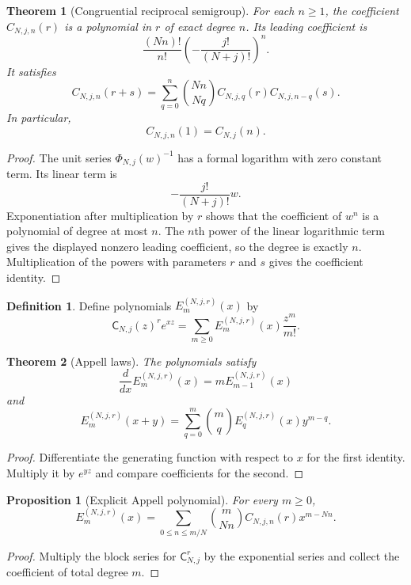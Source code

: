 \documentclass{aomart}
\newtheorem{theorem}{Theorem}[section]
\newtheorem{proposition}[proposition]{Proposition}
\theoremstyle{definition}
\newtheorem{definition}[definition]{Definition}
\theoremstyle{remark}
\newcommand{\Cfun}{\mathsf C}
\begin{document}
\begin{theorem}[Congruential reciprocal semigroup]\label{thm:congruential_semigroup}
For each $n\geq1$, the coefficient $C_{N,j,n}(r)$ is a polynomial in $r$ of exact degree $n$.  Its leading coefficient is
\[
\frac{(Nn)!}{n!}
\left(-\frac{j!}{(N+j)!}\right)^n.
\]
It satisfies
\[
C_{N,j,n}(r+s)
=
\sum_{q=0}^{n}
\binom{Nn}{Nq}
C_{N,j,q}(r)C_{N,j,n-q}(s).
\]
In particular,
\[
C_{N,j,n}(1)=C_{N,j}(n).
\]
\end{theorem}

\begin{proof}
The unit series $\Phi_{N,j}(w)^{-1}$ has a formal logarithm with zero constant term.  Its linear term is
\[
-\frac{j!}{(N+j)!}w.
\]
Exponentiation after multiplication by $r$ shows that the coefficient of $w^n$ is a polynomial of degree at most $n$.  The $n$th power of the linear logarithmic term gives the displayed nonzero leading coefficient, so the degree is exactly $n$.  Multiplication of the powers with parameters $r$ and $s$ gives the coefficient identity.
\end{proof}

\begin{definition}\label{def:block_appell}
Define polynomials $E_m^{(N,j,r)}(x)$ by
\[
\Cfun_{N,j}(z)^re^{xz}
=
\sum_{m\geq0}E_m^{(N,j,r)}(x)\frac{z^m}{m!}.
\]
\end{definition}

\begin{theorem}[Appell laws]\label{thm:appell_laws}
The polynomials satisfy
\[
\frac{d}{dx}E_m^{(N,j,r)}(x)
=
mE_{m-1}^{(N,j,r)}(x)
\]
and
\[
E_m^{(N,j,r)}(x+y)
=
\sum_{q=0}^{m}
\binom mq
E_q^{(N,j,r)}(x)y^{m-q}.
\]
\end{theorem}

\begin{proof}
Differentiate the generating function with respect to $x$ for the first identity.  Multiply it by $e^{yz}$ and compare coefficients for the second.
\end{proof}

\begin{proposition}[Explicit Appell polynomial]\label{prop:explicit_appell}
For every $m\geq0$,
\[
E_m^{(N,j,r)}(x)
=
\sum_{0\leq n\leq m/N}
\binom{m}{Nn}
C_{N,j,n}(r)x^{m-Nn}.
\]
\end{proposition}

\begin{proof}
Multiply the block series for $\Cfun_{N,j}^r$ by the exponential series and collect the coefficient of total degree $m$.
\end{proof}
\end{document}
